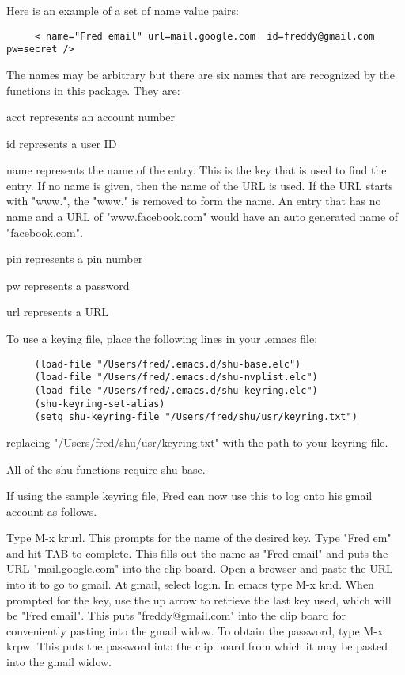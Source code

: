 Here is an example of a set of name value pairs:

\begin{verbatim}
     < name="Fred email" url=mail.google.com  id=freddy@gmail.com  pw=secret />
\end{verbatim}

The names may be arbitrary but there are six names that are recognized by the
functions in this package.  They are:

acct represents an account number

id represents a user ID

name represents the name of the entry.  This is the key that is used to find
the entry.  If no name is given, then the name of the URL is used.  If the URL
starts with "www.", the "www." is removed to form the name.  An entry that has
no name and a URL of "www.facebook.com" would have an auto generated name of
"facebook.com".

pin represents a pin number

pw represents a password

url represents a URL

To use a keying file, place the following lines in your .emacs file:

\begin{verbatim}
     (load-file "/Users/fred/.emacs.d/shu-base.elc")
     (load-file "/Users/fred/.emacs.d/shu-nvplist.elc")
     (load-file "/Users/fred/.emacs.d/shu-keyring.elc")
     (shu-keyring-set-alias)
     (setq shu-keyring-file "/Users/fred/shu/usr/keyring.txt")
\end{verbatim}

replacing "/Users/fred/shu/usr/keyring.txt" with the path to your keyring file.

All of the shu functions require shu-base.

If using the sample keyring file, Fred can now use this to log onto his gmail
account as follows.

Type M-x krurl.  This prompts for the name of the desired key.  Type "Fred em"
and hit TAB to complete.  This fills out the name as "Fred email" and puts the
URL "mail.google.com" into the clip board.  Open a browser and paste the URL
into it to go to gmail.  At gmail, select login.  In emacs type M-x krid.
When prompted for the key, use the up arrow to retrieve the last key used,
which will be "Fred email".  This puts "freddy@gmail.com" into the clip board
for conveniently pasting into the gmail widow.  To obtain the password, type
M-x krpw.  This puts the password into the clip board from which it may be
pasted into the gmail widow.


